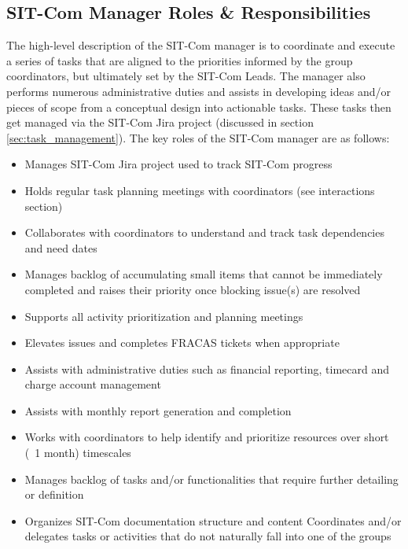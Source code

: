 \documentclass[SE,lsstdraft,authoryear,toc]{lsstdoc}
\begin{document}
\subsection{SIT-Com Manager Roles \& Responsibilities}
\label{sec:manager_r_and_rs}
The high-level description of the SIT-Com manager is to coordinate and execute a series of tasks that are aligned to the priorities informed by the group coordinators, but ultimately set by the SIT-Com Leads.
The manager also performs numerous administrative duties and assists in developing ideas and/or pieces of scope from a conceptual design into actionable tasks.
These tasks then get managed via the SIT-Com Jira project (discussed in section \ref{sec:task_management}). The key roles of the SIT-Com manager are as follows:
\begin{itemize}
    \item Manages SIT-Com Jira project used to track SIT-Com progress
    \item Holds regular task planning meetings with coordinators (see interactions section)
    \item Collaborates with coordinators to understand and track task dependencies and need dates
    \item Manages backlog of accumulating small items that cannot be immediately completed and raises their priority once blocking issue(s) are resolved
    \item Supports all activity prioritization and planning meetings
    \item Elevates issues and completes FRACAS tickets when appropriate
    \item Assists with administrative duties such as financial reporting, timecard and charge account management
    \item Assists with monthly report generation and completion
    \item Works with coordinators to help identify and prioritize resources over short (~1 month) timescales
    \item Manages backlog of tasks and/or functionalities that require further detailing or definition
    \item Organizes SIT-Com documentation structure and content
Coordinates and/or delegates tasks or activities that do not naturally fall into one of the groups
\end{itemize}
\end{document}

